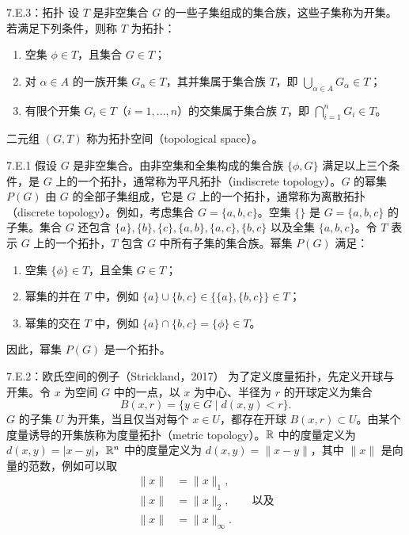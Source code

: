 \begin{bookdefinition}{7.E.3：拓扑}
设 $T$ 是非空集合 $G$ 的一些子集组成的集合族，这些子集称为开集。若满足下列条件，则称 $T$ 为拓扑：
\begin{enumerate}
\item 空集 $\phi\in T$，且集合 $G\in T$；
\item 对 $\alpha\in A$ 的一族开集 $G_\alpha\in T$，其并集属于集合族 $T$，即 $\bigcup_{\alpha\in A}G_\alpha\in T$；
\item 有限个开集 $G_i\in T$（$i=1,\ldots,n$）的交集属于集合族 $T$，即 $\bigcap_{i=1}^nG_i\in T$。
\end{enumerate}
二元组 $(G,T)$ 称为拓扑空间（topological space）。
\end{bookdefinition}

\begin{bookexample}{7.E.1}
假设 $G$ 是非空集合。由非空集和全集构成的集合族 $\{\phi,G\}$ 满足以上三个条件，是 $G$ 上的一个拓扑，通常称为平凡拓扑（indiscrete topology）。$G$ 的幂集 $P(G)$ 由 $G$ 的全部子集组成，它是 $G$ 上的一个拓扑，通常称为离散拓扑（discrete topology）。例如，考虑集合 $G=\{a,b,c\}$。空集 $\{\}$ 是 $G=\{a,b,c\}$ 的子集。集合 $G$ 还包含 $\{a\},\{b\},\{c\},\{a,b\},\{a,c\},\{b,c\}$ 以及全集 $\{a,b,c\}$。令 $T$ 表示 $G$ 上的一个拓扑，$T$ 包含 $G$ 中所有子集的集合族。幂集 $P(G)$ 满足：
\begin{enumerate}
\item 空集 $\{\phi\}\in T$，且全集 $G\in T$；
\item 幂集的并在 $T$ 中，例如 $\{a\}\cup\{b,c\}\in\{\{a\},\{b,c\}\}\in T$；
\item 幂集的交在 $T$ 中，例如 $\{a\}\cap\{b,c\}=\{\phi\}\in T$。
\end{enumerate}
因此，幂集 $P(G)$ 是一个拓扑。
\end{bookexample}

\begin{bookexample}{7.E.2：欧氏空间的例子（Strickland，2017）}
为了定义度量拓扑，先定义开球与开集。令 $x$ 为空间 $G$ 中的一点，以 $x$ 为中心、半径为 $r$ 的开球定义为集合
\[
B(x,r)=\{y\in G\mid d(x,y)<r\}.
\]
$G$ 的子集 $U$ 为开集，当且仅当对每个 $x\in U$，都存在开球 $B(x,r)\subset U$。由某个度量诱导的开集族称为度量拓扑（metric topology）。$\mathbb{R}$ 中的度量定义为 $d(x,y)=|x-y|$，$\mathbb{R}^n$ 中的度量定义为 $d(x,y)=\|x-y\|$，其中 $\|x\|$ 是向量的范数，例如可以取
\[
\begin{aligned}
\|x\|&=\|x\|_1,\\
\|x\|&=\|x\|_2,\qquad\text{以及}\\
\|x\|&=\|x\|_\infty.
\end{aligned}
\]
\end{bookexample}

